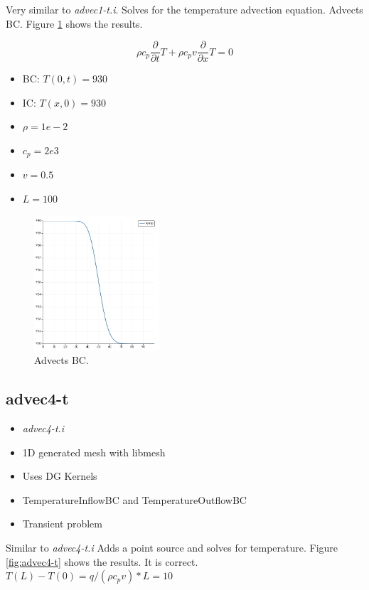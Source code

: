 \documentclass[11pt,letterpaper]{article}
\begin{document}
    Very similar to \textit{advec1-t.i}. Solves for the temperature advection equation.
    Advects BC.
    Figure \ref{fig:advec3-t} shows the results.

	\begin{equation}
    \rho c_p \frac{\partial}{\partial t}T + \rho c_p v \frac{\partial}{\partial x} T = 0
	\end{equation}

	\begin{itemize}
		\item BC: $T(0, t) = 930$
		\item IC: $T(x, 0) = 930$
		\item $\rho = 1e-2$
		\item $c_p = 2e3$
		\item $v = 0.5$
		\item $L = 100$
	\end{itemize}

	\begin{figure}[htbp!]
		\centering
		\includegraphics[height=5cm]{advec3-t}
		\caption{Advects BC.}
		\label{fig:advec3-t}
	\end{figure}

	\subsection{advec4-t}

	\begin{itemize}
		\item \textit{advec4-t.i}
		\item 1D generated mesh with libmesh
		\item Uses DG Kernels
		\item TemperatureInflowBC and TemperatureOutflowBC
		\item Transient problem
	\end{itemize}

    Similar to \textit{advec4-t.i}
    Adds a point source and solves for temperature.
    Figure \ref{fig:advec4-t} shows the results.
    It is correct. $T(L) - T(0) = q/(\rho c_p v )*L = 10$
\end{document}
